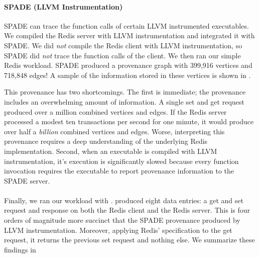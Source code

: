 \paragraph{SPADE (LLVM Instrumentation)}
SPADE can trace the function calls of certain LLVM instrumented executables. We
compiled the Redis server with LLVM instrumentation and integrated it with
SPADE. We did \emph{not} compile the Redis client with LLVM instrumentation, so
SPADE did \emph{not} trace the function calls of the client. We then ran our
simple Redis workload. SPADE produced a provenance graph with 399,916 vertices
and 718,848 edges! A sample of the information stored in these vertices is
shown in .

This provenance has two shortcomings. The first is immediate; the provenance
includes an overwhelming amount of information. A single set and get request
produced over a million combined vertices and edges. If the Redis server
processed a modest ten transactions per second for one minute, it would produce
over half a \emph{billion} combined vertices and edges. Worse, interpreting
this provenance requires a deep understanding of the underlying Redis
implementation. Second, when an executable is compiled with LLVM
instrumentation, it's  execution is significantly slowed because every function
invocation requires the executable to report provenance information to the
SPADE server.

\paragraph{\fluent{}}
Finally, we ran our workload with \fluent{}. \fluent{} produced eight data
entries: a get and set request and response on both the Redis client and the
Redis server. This is four orders of magnitude more succinct that the SPADE
provenance produced by LLVM instrumentation. Moreover, applying Redis'
\watprovenance{} specification to the get request, it returns the previous set
request and nothing else. We summarize these findings in 


